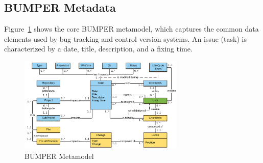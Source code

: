 \documentclass[conference]{IEEEtran}
\begin{document}
\subsection{BUMPER Metadata}
\label{sub:BUMPER Metadata}

Figure~\ref{fig:bumper-metamodel}  shows the core BUMPER metamodel, which captures the common data elements used by bug tracking and control version systems.
An issue (task) is characterized by a date, title, description, and a fixing time.

\begin{figure}
  \centering
  \includegraphics[width=0.7\textwidth]{media/Bumper-Model.png}
  \caption{BUMPER Metamodel\label{fig:bumper-metamodel}}
\end{figure}
\end{document}
